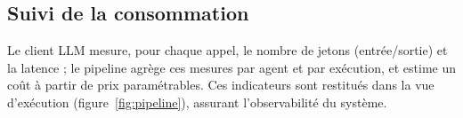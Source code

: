 \subsection{Suivi de la consommation}
\label{sec:couts}
Le client LLM mesure, pour chaque appel, le nombre de jetons (entrée/sortie)
et la latence ; le pipeline agrège ces mesures par agent et par exécution, et
estime un coût à partir de prix paramétrables. Ces indicateurs sont restitués
dans la vue d'exécution (figure~\ref{fig:pipeline}), assurant l'observabilité
du système.

